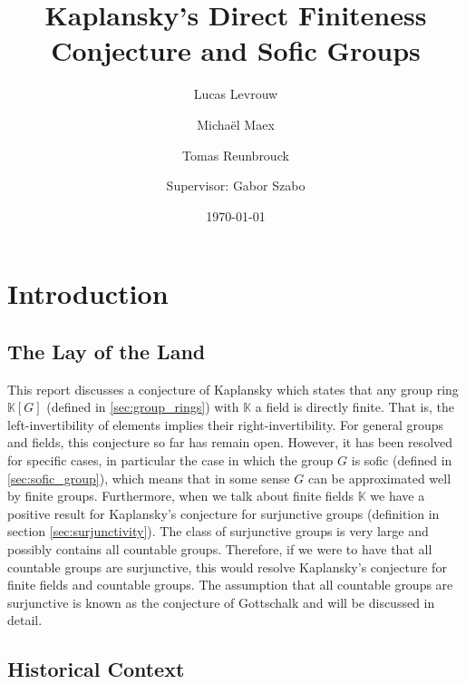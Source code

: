 \documentclass[titlepage, a4paper]{article}
\author{Lucas Levrouw \and Michaël Maex \and Tomas Reunbrouck \and Supervisor: Gabor Szabo}
\title{Kaplansky's Direct Finiteness Conjecture and Sofic Groups}
\date{\today}
\theoremstyle{theoremdd}
\theoremstyle{definition}
\theoremstyle{remark}
\begin{document}
    \maketitle
\begingroup
  \pagestyle{empty}
  \null
  \newpage
\endgroup
{}
\tableofcontents
\pagebreak



\section{Introduction}\label{sec:intro}

\subsection*{The Lay of the Land}

This report discusses a conjecture of Kaplansky which states that any group ring $\mathbb{K}[G]$ (defined in \cref{sec:group_rings}) with $\mathbb{K}$ a field is directly finite. That is, the left-invertibility of elements implies their right-invertibility. For general groups and fields, this conjecture so far has remain open. However, it has been resolved for specific cases, in particular the case in which the group $G$ is sofic (defined in \cref{sec:sofic_group}), which means that in some sense $G$ can be approximated well by finite groups. Furthermore, when we talk about finite fields $\mathbb{K}$ we have a positive result for Kaplansky’s conjecture for surjunctive groups (definition in section \ref{sec:surjunctivity}). The class of surjunctive groups is very large and possibly contains all countable groups. Therefore, if we were to have that all countable groups are surjunctive, this would resolve Kaplansky's conjecture for finite fields and countable groups.
The assumption that all countable groups are surjunctive is known as the conjecture of Gottschalk and will be discussed in detail.

\subsection*{Historical Context}
\end{document}

